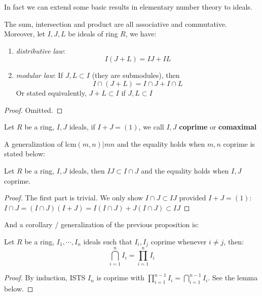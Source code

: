 \documentclass{note-eng}
\begin{document}
In fact we can extend some basic results in elementary number theory to ideals.

\begin{proposition}
    The sum, intersection and product are all associative and commutative. Moreover, let $I, J, L$ be ideals of ring $R$, we have:
    \begin{enumerate}
        \item \textit{distributive law}:
        $$I(J + L) = IJ + IL$$
        \item \textit{modular law}: If $J, L \subset I$ (they are submodules), then
        $$I \cap (J + L) = I \cap J + I \cap L$$
        Or stated equivalently, $J + L \subset I$ if $J, L \subset I$
    \end{enumerate}
\end{proposition}

\begin{proof}
    Omitted.
\end{proof}

\begin{definition}
    Let $R$ be a ring, $I, J$ ideals, if $I + J = (1)$, we call $I, J$ \textbf{coprime} or \textbf{comaximal}
\end{definition}

A generalization of $\mathrm{lcm}(m, n) | mn$ and the equality holds when $m, n$ coprime is stated below:

\begin{proposition}
    Let $R$ be a ring, $I, J$ ideals, then $IJ \subset I \cap J$ and the equality holds when $I, J$ coprime.
\end{proposition}

\begin{proof}
    The first part is trivial. We only show $I \cap J \subset IJ$ provided $I + J = (1)$: $I \cap J = (I \cap J)(I + J) = I(I \cap J) + J(I \cap J) \subset IJ$
\end{proof}

And a corollary / generalization of the previous proposition is:

\begin{corollary}
    Let $R$ be a ring, $I_1, \cdots, I_n$ ideals such that $I_i, I_j$ coprime whenever $i \ne j$, then:
    $$\bigcap\limits_{i = 1}^{n} I_i = \prod\limits_{i = 1}^{n} I_i$$
\end{corollary}

\begin{proof}
    By induction, ISTS $I_n$ is coprime with $\prod\limits_{i = 1}^{n - 1} I_i = \bigcap\limits_{i = 1}^{n - 1} I_i$. See the lemma below. 
\end{proof}
\end{document}
